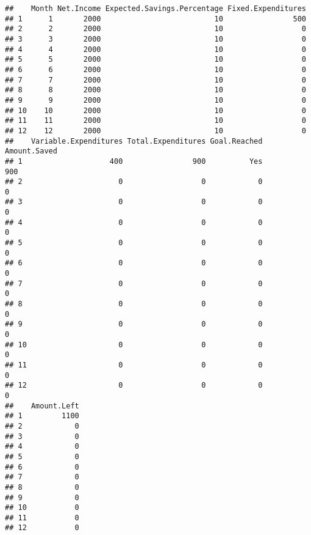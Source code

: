 \documentclass[
]{article}
\begin{document}
\begin{verbatim}
##    Month Net.Income Expected.Savings.Percentage Fixed.Expenditures
## 1      1       2000                          10                500
## 2      2       2000                          10                  0
## 3      3       2000                          10                  0
## 4      4       2000                          10                  0
## 5      5       2000                          10                  0
## 6      6       2000                          10                  0
## 7      7       2000                          10                  0
## 8      8       2000                          10                  0
## 9      9       2000                          10                  0
## 10    10       2000                          10                  0
## 11    11       2000                          10                  0
## 12    12       2000                          10                  0
##    Variable.Expenditures Total.Expenditures Goal.Reached Amount.Saved
## 1                    400                900          Yes          900
## 2                      0                  0            0            0
## 3                      0                  0            0            0
## 4                      0                  0            0            0
## 5                      0                  0            0            0
## 6                      0                  0            0            0
## 7                      0                  0            0            0
## 8                      0                  0            0            0
## 9                      0                  0            0            0
## 10                     0                  0            0            0
## 11                     0                  0            0            0
## 12                     0                  0            0            0
##    Amount.Left
## 1         1100
## 2            0
## 3            0
## 4            0
## 5            0
## 6            0
## 7            0
## 8            0
## 9            0
## 10           0
## 11           0
## 12           0
\end{verbatim}
\end{document}
